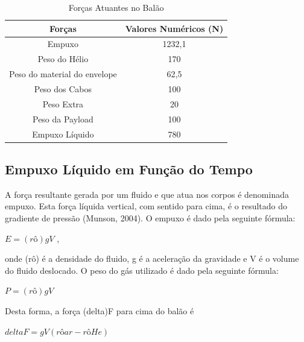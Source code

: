\begin{table}[H]
	\centering
	\begin{tabular}{|c|c|}
		\hline
		\rowcolor[HTML]{FFFFFF}
		{\color[HTML]{000000} \textbf{Forças}} & {\color[HTML]{000000} \textbf{Valores Numéricos (N)}} \\ \hline
		Empuxo                                 & 1232,1                                                \\ \hline
		Peso do Hélio                          & 170                                                   \\ \hline
		Peso do material do envelope           & 62,5                                                  \\ \hline
		Peso dos Cabos                         & 100                                                   \\ \hline
		Peso Extra                             & 20                                                    \\ \hline
		Peso da Payload                        & 100                                                   \\ \hline
		Empuxo Líquido                         & 780                                                   \\ \hline
	\end{tabular}
	\caption{Forças Atuantes no Balão}
	\label{tab:forcasAtuantes}
\end{table}

\subsection{Empuxo Líquido em Função do Tempo} %
\label{sub:empuxo_l_quido_em_fun_o_do_tempo}

	A força resultante gerada por um  fluido e que atua nos corpos é denominada empuxo. Esta força líquida vertical, com sentido para cima, é o resultado do gradiente de pressão (Munson, 2004). O empuxo é dado pela seguinte fórmula:

	$E = (rô)gV$ ,

	onde (rô) é a densidade do fluido, g é a aceleração da gravidade e V é o volume do fluido deslocado.
	O peso do gás utilizado é dado pela seguinte fórmula:

	$P = (rô)g V$

	Desta forma, a força (delta)F para cima do balão é

	$deltaF =  g V (rôar - rôHe)$

